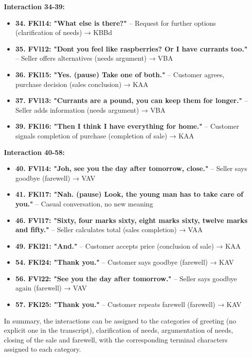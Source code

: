 \documentclass[
]{article}
\begin{document}
\textbf{Interaction 34-39:}

\begin{itemize}
\item
  \textbf{34. FKl14: "What else is there?"} -- Request for further
  options (clarification of needs) → KBBd
\item
  \textbf{35. FVl12: "Don\textquotesingle t you feel like raspberries?
  Or I have currants too."} -- Seller offers alternatives (needs
  argument) → VBA
\item
  \textbf{36. FKl15: "Yes. (pause) Take one of both."} -- Customer
  agrees, purchase decision (sales conclusion) → KAA
\item
  \textbf{37. FVl13: "Currants are a pound, you can keep them for
  longer."} -- Seller adds information (needs argument) → VBA
\item
  \textbf{39. FKl16: "Then I think I have everything for home."} --
  Customer signals completion of purchase (completion of sale) → KAA
\end{itemize}

\textbf{Interaction 40-58:}

\begin{itemize}
\item
  \textbf{40. FVl14: "Joh, see you the day after tomorrow, close."} --
  Seller says goodbye (farewell) → VAV
\item
  \textbf{41. FKl17: "Nah. (pause) Look, the young man has to take care
  of you."} -- Casual conversation, no new meaning
\item
  \textbf{46. \hspace{0pt}\hspace{0pt}FVl17: "Sixty, four marks sixty,
  eight marks sixty, twelve marks and fifty."} -- Seller calculates
  total (sales completion) → VAA
\item
  \textbf{49. FKl21: "And."} -- Customer accepts price (conclusion of
  sale) → KAA
\item
  \textbf{54. FKl24: "Thank you."} -- Customer says goodbye (farewell) →
  KAV
\item
  \textbf{56. FVl22: "See you the day after tomorrow."} -- Seller says
  goodbye again (farewell) → VAV
\item
  \textbf{57. FKl25: "Thank you."} -- Customer repeats farewell
  (farewell) → KAV
\end{itemize}

In summary, the interactions can be assigned to the categories of
greeting (no explicit one in the transcript), clarification of needs,
argumentation of needs, closing of the sale and farewell, with the
corresponding terminal characters assigned to each category.
\end{document}
